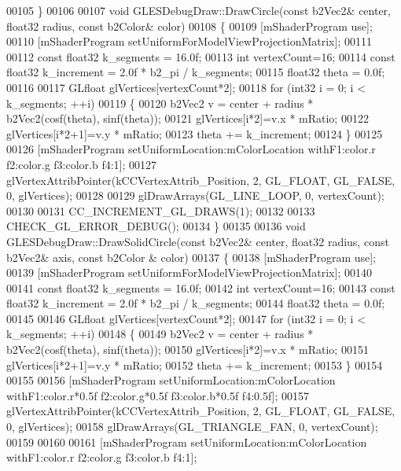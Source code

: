 \begin{DoxyCode}
00105 \}
00106 
00107 \textcolor{keywordtype}{void} GLESDebugDraw::DrawCircle(\textcolor{keyword}{const} b2Vec2& center, float32 radius, \textcolor{keyword}{const} b2Color& color)
00108 \{
00109     [mShaderProgram use];
00110     [mShaderProgram setUniformForModelViewProjectionMatrix];
00111 
00112     \textcolor{keyword}{const} float32 k\_segments = 16.0f;
00113     \textcolor{keywordtype}{int} vertexCount=16;
00114     \textcolor{keyword}{const} float32 k\_increment = 2.0f * b2\_pi / k\_segments;
00115     float32 theta = 0.0f;
00116 
00117     GLfloat             glVertices[vertexCount*2];
00118     \textcolor{keywordflow}{for} (int32 i = 0; i < k\_segments; ++i)
00119     \{
00120         b2Vec2 v = center + radius * b2Vec2(cosf(theta), sinf(theta));
00121         glVertices[i*2]=v.x * mRatio;
00122         glVertices[i*2+1]=v.y * mRatio;
00123         theta += k\_increment;
00124     \}
00125 
00126     [mShaderProgram setUniformLocation:mColorLocation withF1:color.r f2:color.g f3:color.b f4:1];
00127     glVertexAttribPointer(kCCVertexAttrib\_Position, 2, GL\_FLOAT, GL\_FALSE, 0, glVertices);
00128 
00129     glDrawArrays(GL\_LINE\_LOOP, 0, vertexCount);
00130 
00131     CC\_INCREMENT\_GL\_DRAWS(1);
00132 
00133     CHECK\_GL\_ERROR\_DEBUG();
00134 \}
00135 
00136 \textcolor{keywordtype}{void} GLESDebugDraw::DrawSolidCircle(\textcolor{keyword}{const} b2Vec2& center, float32 radius, \textcolor{keyword}{const} b2Vec2& axis, \textcolor{keyword}{const} b2Color
      & color)
00137 \{
00138     [mShaderProgram use];
00139     [mShaderProgram setUniformForModelViewProjectionMatrix];
00140 
00141     \textcolor{keyword}{const} float32 k\_segments = 16.0f;
00142     \textcolor{keywordtype}{int} vertexCount=16;
00143     \textcolor{keyword}{const} float32 k\_increment = 2.0f * b2\_pi / k\_segments;
00144     float32 theta = 0.0f;
00145 
00146     GLfloat             glVertices[vertexCount*2];
00147     \textcolor{keywordflow}{for} (int32 i = 0; i < k\_segments; ++i)
00148     \{
00149         b2Vec2 v = center + radius * b2Vec2(cosf(theta), sinf(theta));
00150         glVertices[i*2]=v.x * mRatio;
00151         glVertices[i*2+1]=v.y * mRatio;
00152         theta += k\_increment;
00153     \}
00154 
00155 
00156     [mShaderProgram setUniformLocation:mColorLocation withF1:color.r*0.5f f2:color.g*0.5f f3:color.b*0.5f 
      f4:0.5f];
00157     glVertexAttribPointer(kCCVertexAttrib\_Position, 2, GL\_FLOAT, GL\_FALSE, 0, glVertices);
00158     glDrawArrays(GL\_TRIANGLE\_FAN, 0, vertexCount);
00159 
00160 
00161     [mShaderProgram setUniformLocation:mColorLocation withF1:color.r f2:color.g f3:color.b f4:1];

\end{DoxyCode}
